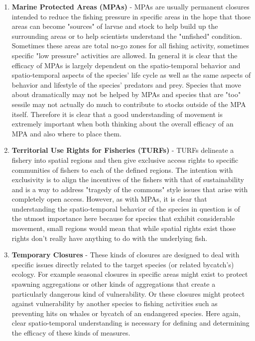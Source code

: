 \documentclass[11pt]{article}
\begin{document}
\begin{enumerate}
\item \textbf{Marine Protected Areas (MPAs)} - MPAs are usually permanent closures intended to reduce the fishing pressure in specific areas in the hope that those areas can become "sources" of larvae and stock to help build up the surrounding areas or to help scientists understand the "unfished" condition. Sometimes these areas are total no-go zones for all fishing activity, sometimes specific "low pressure" activities are allowed. In general it is clear that the efficacy of MPAs is largely dependent on the spatio-temporal behavior and spatio-temporal aspects of the species' life cycle as well as the same aspects of behavior and lifestyle of the species' predators and prey. Species that move about dramatically may not be helped by MPAs and species that are "too" sessile may not actually do much to contribute to stocks outside of the MPA itself. Therefore it is clear that a good understanding of movement is extremely important when both thinking about the overall efficacy of an MPA and also where to place them. 
\item \textbf{Territorial Use Rights for Fisheries (TURFs)} - TURFs delineate a fishery into spatial regions and then give exclusive access rights to specific communities of fishers to each of the defined regions. The intention with exclusivity is to align the incentives of the fishers with that of sustainability and is a way to address "tragedy of the commons" style issues that arise with completely open access. However, as with MPAs, it is clear that understanding the spatio-temporal behavior of the species in question is of the utmost importance here because for species that exhibit considerable movement, small regions would mean that while spatial rights exist those rights don't really have anything to do with the underlying fish. 
\item \textbf{Temporary Closures} - These kinds of closures are designed to deal with specific issues directly related to the target species (or related bycatch's) ecology. For example seasonal closures in specific areas might exist to protect spawning aggregations or other kinds of aggregations that create a particularly dangerous kind of vulnerability. Or these closures might protect against vulnerability by another species to fishing activities such as preventing hits on whales or bycatch of an endangered species. Here again, clear spatio-temporal understanding is necessary for defining and determining the efficacy of these kinds of measures. 

\end{enumerate}
\end{document}
